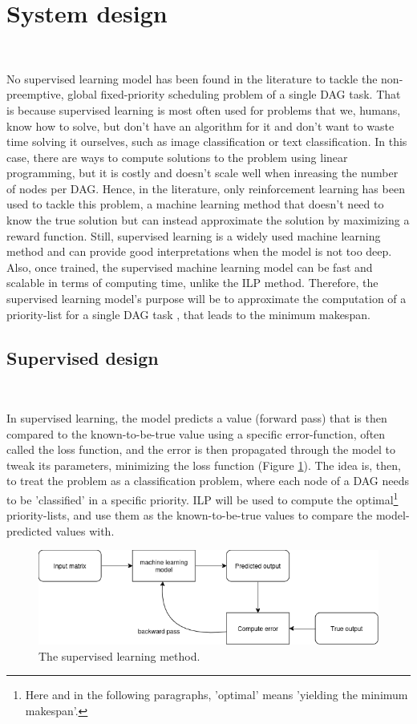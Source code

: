 \section{System design}
\label{sec:system_design}
~

No supervised learning model has been found in the literature to 
tackle the non-preemptive, global fixed-priority scheduling problem of a single DAG task.
That is because supervised learning is most often used for problems
that we, humans, know how to solve, but don't have an algorithm for it
and don't want to waste time solving it ourselves,
such as image classification or text classification.
In this case, there are ways to compute solutions to the problem
using linear programming, but it is costly and doesn't scale well 
when inreasing the number of nodes per DAG.
Hence, in the literature, only reinforcement learning has been
used to tackle this problem, a machine learning method that 
doesn't need to know the true solution but 
can instead approximate the solution by maximizing a reward function.
Still, supervised learning is a widely used machine learning method
and can provide good interpretations when the model is not too deep.
Also, once trained, the supervised machine learning model can be 
fast and scalable in terms of computing time, unlike the ILP method.
Therefore, the supervised learning model's purpose will be to
approximate the computation of a priority-list for a single DAG task
, that leads to the minimum makespan.

\subsection{Supervised design}
~

In supervised learning, 
the model predicts a value (forward pass) that is then compared to the known-to-be-true value using a
specific error-function, often called the loss function,
and the error is then propagated through the model to tweak its parameters, minimizing the loss function
(Figure \ref{fig:supervised_learning}).
The idea is, then, to treat the problem as a classification problem,
where each node of a DAG needs to be 'classified' in a specific priority.
ILP will be used to compute the optimal\footnote{Here and in the following paragraphs, 'optimal' means 'yielding the minimum makespan'.}
priority-lists, and use them as the known-to-be-true values to compare the model-predicted values with.


\begin{figure}
    \centering
    \includegraphics[width=\linewidth]{images/supervised_learning_diagram.drawio.png}
    \caption{The supervised learning method.}
    \label{fig:supervised_learning}
\end{figure}



